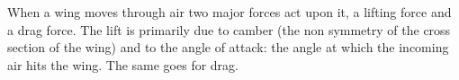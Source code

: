 When a wing moves through air two major forces act upon it, a lifting force and a drag force.
The lift is primarily due to camber (the non symmetry of the cross section of the wing) and to the angle of attack: the angle at which the incoming air hits the wing.
The same goes for drag.